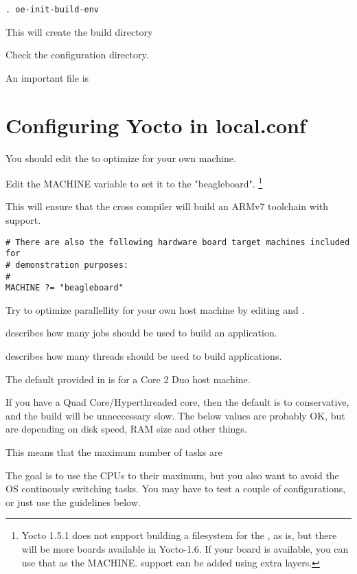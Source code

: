 \begin{verbatim}
. oe-init-build-env
\end{verbatim}

This will create the build directory

Check the  configuration directory.

An important file is 

\section{Configuring Yocto in local.conf}

You should edit the  to optimize for your own machine.

Edit the MACHINE variable to set it to the "beagleboard".
\footnote{Yocto 1.5.1 does not support building a filesystem for the \devboard, as is,
but there will be more boards available in Yocto-1.6. If your board is available, you can use
that as the MACHINE.  \devboard support can be added using extra layers.}

This will ensure that the cross compiler will build an ARMv7 toolchain with  support.

\begin{verbatim}
# There are also the following hardware board target machines included for 
# demonstration purposes:
#
MACHINE ?= "beagleboard"
\end{verbatim}

Try to optimize parallellity for your own host machine by editing 
and .

 describes how many  jobs should be used
to build an application. 

 describes how many threads should be used to
build applications. 

The default provided in  is for a Core 2 Duo host machine.

If you have a Quad Core/Hyperthreaded core, then the default is to conservative,
and the build will be unneccessary slow.
The below values are probably OK, but are depending on disk speed,
RAM size and other things.

This means that the maximum number of tasks are  

The goal is to use the CPUs to their maximum, but you also want
to avoid the OS continously switching tasks. You may have to test a couple
of configurations, or just use the guidelines below.


